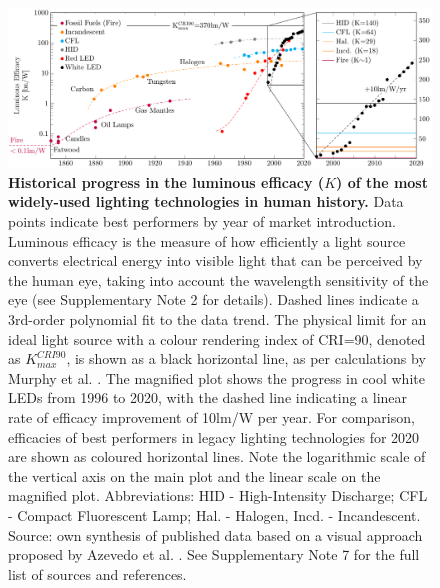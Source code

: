 \documentclass[parskip=full]{article}
\begin{document}
\begin{figure}[h!]
 \centering
 \includegraphics[width=\textwidth]{figures/history_efficacy.pdf}
 \caption{\textbf{Historical progress in the luminous efficacy ($K$) of the most widely-used lighting technologies in human history.} Data points indicate best performers by year of market introduction. Luminous efficacy is the measure of how efficiently a light source converts electrical energy into visible light that can be perceived by the human eye, taking into account the wavelength sensitivity of the eye (see Supplementary Note 2 for details). Dashed lines indicate a 3rd-order polynomial fit to the data trend. The physical limit for an ideal light source with a colour rendering index of CRI=90, denoted as $K_{max}^{CRI90}$, is shown as a black horizontal line, as per calculations by Murphy et al. \cite{Murphy2012}. The magnified plot shows the progress in cool white LEDs from 1996 to 2020, with the dashed line indicating a linear rate of efficacy improvement of 10lm/W per year. For comparison, efficacies of best performers in legacy lighting technologies for 2020 are shown as coloured horizontal lines. Note the logarithmic scale of the vertical axis on the main plot and the linear scale on the magnified plot. Abbreviations: HID - High-Intensity Discharge; CFL - Compact Fluorescent Lamp; Hal. - Halogen, Incd. - Incandescent. Source: own synthesis of published data based on a visual approach proposed by Azevedo et al. \cite{azevedo2009transition}. See Supplementary Note 7 for the full list of sources and references.}
 \label{fgr:history_efficacy}
\end{figure}
\end{document}
